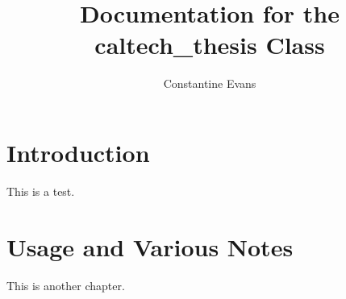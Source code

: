 \documentclass[thesisdraft]{caltech_thesis}
\author{Constantine Evans}
\title{Documentation for the {caltech\_thesis} Class}
\begin{document}
\maketitle

\tableofcontents

\mainmatter

\chapter{Introduction}

This is a test.

\chapter{Usage and Various Notes}

This is another chapter.
\end{document}
